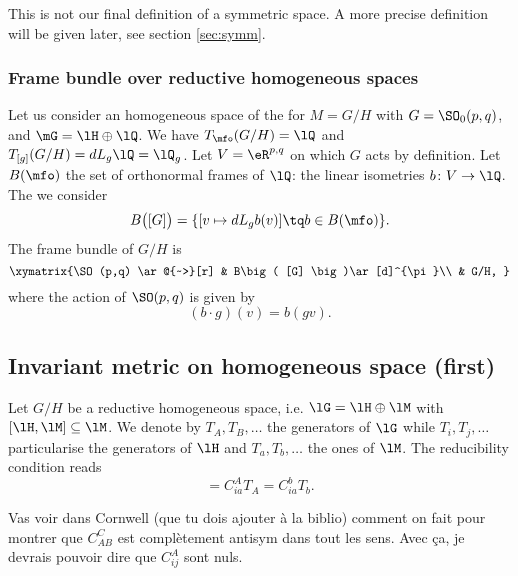 \begin{remark}
This is not our final definition of a symmetric space. A more precise definition will be given later, see section \ref{sec:symm}.
\end{remark}

					\subsubsection{Frame bundle over reductive homogeneous spaces}
\label{PgFrameHomo}

Let us consider an homogeneous space of the for $M=G/H$ with $G=\SO_0(p,q)$, and $\mG=\lH\oplus\lQ$. We have $T_{\mfo}(G/H)=\lQ$ and $T_{[g]}(G/H)=dL_g\lQ=\lQ_g$. Let $V=\eR^{p,q}$ on which $G$ acts by definition. Let $B(\mfo)$ the set of orthonormal frames of $\lQ$: the linear isometries $b\colon V\to \lQ$. The we consider
\begin{equation}
	B\big( [G] \big)=\{ [v\mapsto dL_gb(v)]\tq b\in B(\mfo) \}.
\end{equation}
The frame bundle of $G/H$ is
	\begin{equation}
\xymatrix{%
   \SO(p,q) \ar@{~>}[r]		&	B\big( [G] \big)\ar[d]^{\pi}\\
   				&	G/H,
 }
\end{equation}
where the action of $\SO(p,q)$ is given by
\begin{equation}
	(b\cdot g)(v)=b(gv).
\end{equation}

\subsection{Invariant metric on homogeneous space (first)}

Let $G/H$ be a reductive homogeneous space, i.e. $\lG=\lH\oplus\lM$ with $[\lH,\lM]\subseteq\lM$. We denote by $T_A,T_B,\ldots$ the generators of $\lG$ while $T_i,T_j,\ldots$ particularise the generators of $\lH$ and $T_a,T_b,\ldots$ the ones of $\lM$. The reducibility condition reads
\begin{equation}
  [T_i,T_a]=C_{ia}^AT_A=C_{ia}^bT_b.
\end{equation}

\begin{probleme}        \label{ProbAvecCorwell}
Vas voir dans Cornwell (que tu dois ajouter \`a la biblio) comment on fait pour montrer que $C_{AB}^C$ est compl\`etement antisym dans tout les sens. Avec \c ca, je devrais pouvoir dire que $C_{ij}^A$ sont nuls.
\end{probleme}

